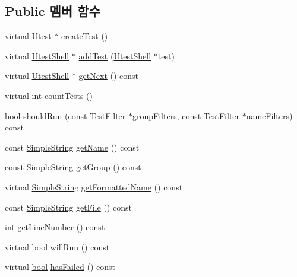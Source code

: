 \subsection*{Public 멤버 함수}
\begin{DoxyCompactItemize}
\item 
virtual \hyperlink{class_utest}{Utest} $\ast$ \hyperlink{class_function_pointer_utest_shell_ac5928416febd74092397b39448758890}{create\+Test} ()
\item 
virtual \hyperlink{class_utest_shell}{Utest\+Shell} $\ast$ \hyperlink{class_utest_shell_a107d518376747143c07442a9e957b613}{add\+Test} (\hyperlink{class_utest_shell}{Utest\+Shell} $\ast$test)
\item 
virtual \hyperlink{class_utest_shell}{Utest\+Shell} $\ast$ \hyperlink{class_utest_shell_a1ac818ddaedf486843c68a5852de42ff}{get\+Next} () const 
\item 
virtual int \hyperlink{class_utest_shell_aabfe7889f5907ce121416805431c4866}{count\+Tests} ()
\item 
\hyperlink{avb__gptp_8h_af6a258d8f3ee5206d682d799316314b1}{bool} \hyperlink{class_utest_shell_aecee9fc54f1114c23fd48360855b8d46}{should\+Run} (const \hyperlink{class_test_filter}{Test\+Filter} $\ast$group\+Filters, const \hyperlink{class_test_filter}{Test\+Filter} $\ast$name\+Filters) const 
\item 
const \hyperlink{class_simple_string}{Simple\+String} \hyperlink{class_utest_shell_a454500e4f7023136a9a6a956323e3a77}{get\+Name} () const 
\item 
const \hyperlink{class_simple_string}{Simple\+String} \hyperlink{class_utest_shell_a9d203c5f3c7cb6d28b66189a20735dca}{get\+Group} () const 
\item 
virtual \hyperlink{class_simple_string}{Simple\+String} \hyperlink{class_utest_shell_af1b3219048ca8ae0e2bb935b813b4b92}{get\+Formatted\+Name} () const 
\item 
const \hyperlink{class_simple_string}{Simple\+String} \hyperlink{class_utest_shell_ac086867db63bc447ebef78844034d289}{get\+File} () const 
\item 
int \hyperlink{class_utest_shell_ae48a165945bebe01fd777069441e614e}{get\+Line\+Number} () const 
\item 
virtual \hyperlink{avb__gptp_8h_af6a258d8f3ee5206d682d799316314b1}{bool} \hyperlink{class_utest_shell_afa35d9bf0fd1c772b04f48d89d318a70}{will\+Run} () const 
\item 
virtual \hyperlink{avb__gptp_8h_af6a258d8f3ee5206d682d799316314b1}{bool} \hyperlink{class_utest_shell_ae4deec08ed507f9a2f1cced854fc5a16}{has\+Failed} () const 

\end{DoxyCompactItemize}
